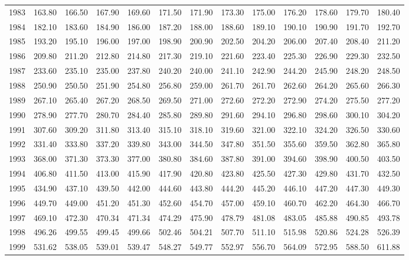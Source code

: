 \begin{longtable}{rrrrrrrrrrrrr}
  1983 & 163.80 & 166.50 & 167.90 & 169.60 & 171.50 & 171.90 & 173.30 & 175.00 & 176.20 & 178.60 & 179.70 & 180.40 \\ 
  1984 & 182.10 & 183.60 & 184.90 & 186.00 & 187.20 & 188.00 & 188.60 & 189.10 & 190.10 & 190.90 & 191.70 & 192.70 \\ 
  1985 & 193.20 & 195.10 & 196.00 & 197.00 & 198.90 & 200.90 & 202.50 & 204.20 & 206.00 & 207.40 & 208.40 & 211.20 \\ 
  1986 & 209.80 & 211.20 & 212.80 & 214.80 & 217.30 & 219.10 & 221.60 & 223.40 & 225.30 & 226.90 & 229.30 & 232.50 \\ 
  1987 & 233.60 & 235.10 & 235.00 & 237.80 & 240.20 & 240.00 & 241.10 & 242.90 & 244.20 & 245.90 & 248.20 & 248.50 \\ 
  1988 & 250.90 & 250.50 & 251.90 & 254.80 & 256.80 & 259.00 & 261.70 & 261.70 & 262.60 & 264.20 & 265.60 & 266.30 \\ 
  1989 & 267.10 & 265.40 & 267.20 & 268.50 & 269.50 & 271.00 & 272.60 & 272.20 & 272.90 & 274.20 & 275.50 & 277.20 \\ 
  1990 & 278.90 & 277.70 & 280.70 & 284.40 & 285.80 & 289.80 & 291.60 & 294.10 & 296.80 & 298.60 & 300.10 & 304.20 \\ 
  1991 & 307.60 & 309.20 & 311.80 & 313.40 & 315.10 & 318.10 & 319.60 & 321.00 & 322.10 & 324.20 & 326.50 & 330.60 \\ 
  1992 & 331.40 & 333.80 & 337.20 & 339.80 & 343.00 & 344.50 & 347.80 & 351.50 & 355.60 & 359.50 & 362.80 & 365.80 \\ 
  1993 & 368.00 & 371.30 & 373.30 & 377.00 & 380.80 & 384.60 & 387.80 & 391.00 & 394.60 & 398.90 & 400.50 & 403.50 \\ 
  1994 & 406.80 & 411.50 & 413.00 & 415.90 & 417.90 & 420.80 & 423.80 & 425.50 & 427.30 & 429.80 & 431.70 & 432.50 \\ 
  1995 & 434.90 & 437.10 & 439.50 & 442.00 & 444.60 & 443.80 & 444.20 & 445.20 & 446.10 & 447.20 & 447.30 & 449.30 \\ 
  1996 & 449.70 & 449.00 & 451.20 & 451.30 & 452.60 & 454.70 & 457.00 & 459.10 & 460.70 & 462.20 & 464.30 & 466.70 \\ 
  1997 & 469.10 & 472.30 & 470.34 & 471.34 & 474.29 & 475.90 & 478.79 & 481.08 & 483.05 & 485.88 & 490.85 & 493.78 \\ 
  1998 & 496.26 & 499.55 & 499.45 & 499.66 & 502.46 & 504.21 & 507.70 & 511.10 & 515.98 & 520.86 & 524.28 & 526.39 \\ 
  1999 & 531.62 & 538.05 & 539.01 & 539.47 & 548.27 & 549.77 & 552.97 & 556.70 & 564.09 & 572.95 & 588.50 & 611.88 \\ 

\end{longtable}
